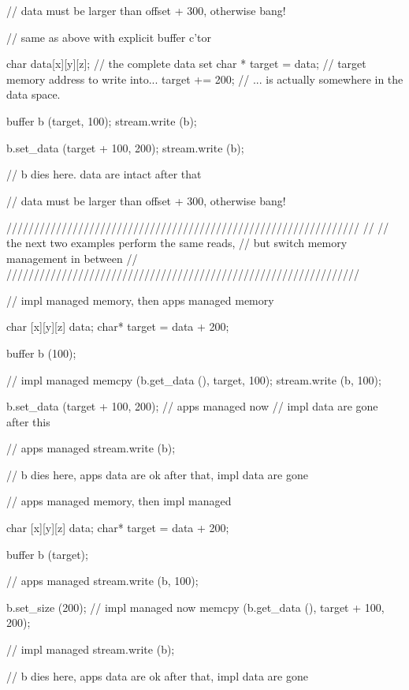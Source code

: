 \begin{mycode}
{    // data must be larger than offset + 300, otherwise bang!
  }
  
  
  // same as above with explicit buffer c'tor
  {
    char   data[x][y][z]; // the complete data set
    char * target = data; // target memory address to write into...
    target += 200;          // ... is actually somewhere in the data space.
  
    {
      buffer b (target, 100);
      stream.write (b);
  
      b.set_data (target + 100, 200);
      stream.write (b);
  
    } // b dies here.  data are intact after that
  
  
    // data must be larger than offset + 300, otherwise bang!
  }
  
  
  ////////////////////////////////////////////////////////////////
  //
  // the next two examples perform the same reads, 
  // but switch memory management in between
  //
  ////////////////////////////////////////////////////////////////
  
  // impl managed memory, then apps managed memory
  {
    {
      char [x][y][z] data;
      char* target = data + 200;
  
      buffer b (100);
  
      // impl managed
      memcpy (b.get_data (), target, 100);
      stream.write (b, 100);
  
      b.set_data (target + 100, 200); // apps managed now
                                      // impl data are gone after this
  
      // apps managed
      stream.write (b);
  
    } // b dies here, apps data are ok after that, impl data are gone
  }
  
  
  // apps managed memory, then impl managed
  {
    {
      char [x][y][z] data;
      char* target = data + 200;
  
      buffer b (target);
  
      // apps managed
      stream.write (b, 100);
  
      b.set_size (200); // impl managed now
      memcpy (b.get_data (), target + 100, 200);
  
      // impl managed
      stream.write (b);
  
    } // b dies here, apps data are ok after that, impl data are gone
  }
 \end{mycode}
 
